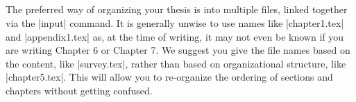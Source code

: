 \begin{lstlisting}



\end{lstlisting}

The preferred way of organizing your thesis is into multiple files, linked together via the |input| command. 
It is generally unwise to use names like |chapter1.tex| and |appendix1.tex| as, at the time of writing, it
may not even be known if you are writing Chapter 6 or Chapter 7.
We suggest you give the file names based on the content, like |survey.tex|, rather than based on organizational
structure, like |chapter5.tex|. This will allow you to re-organize the ordering of sections and chapters without
getting confused.
